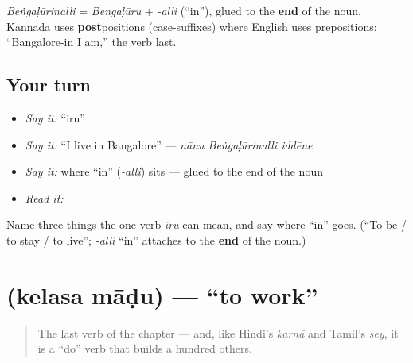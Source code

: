 \begin{grammarlens}[title={Grammar Lens: \textquotedblleft{}in\textquotedblright{} comes after the noun}]
\emph{Beṅgaḷūrinalli} = \emph{Bengaḷūru} + \emph{-alli} (\textquotedblleft{}in\textquotedblright{}), glued to the \textbf{end} of the noun. Kannada uses \textbf{post}positions (case-suffixes) where English uses prepositions: \textquotedblleft{}Bangalore-in I am,\textquotedblright{} the verb last.
\end{grammarlens}

\subsection*{Your turn}
\begin{itemize}
\raggedright
  \item \emph{Say it:} \textquotedblleft{}iru\textquotedblright{}
  \item \emph{Say it:} \textquotedblleft{}I live in Bangalore\textquotedblright{} — \emph{nānu Beṅgaḷūrinalli iddēne}
  \item \emph{Say it:} where \textquotedblleft{}in\textquotedblright{} (\emph{-alli}) sits — glued to the end of the noun
  \item \emph{Read it:} \textbf{}
\end{itemize}

\begin{tcolorbox}[breakable,colback=teal!4,colframe=teal!35!black,title={Before you move on}]
Name three things the one verb \emph{iru} can mean, and say where \textquotedblleft{}in\textquotedblright{} goes. (\textquotedblleft{}To be / to stay / to live\textquotedblright{}; \emph{-alli} \textquotedblleft{}in\textquotedblright{} attaches to the \textbf{end} of the noun.)
\end{tcolorbox}
\section[\texorpdfstring{\kn{ಕೆಲಸ} \kn{ಮಾಡು} (kelasa māḍu)}{ಕೆಲಸ ಮಾಡು (kelasa māḍu)}]{  (kelasa māḍu) — \textquotedblleft{}to work\textquotedblright{}}

\label{lesson:KA-C05-kelasa-maadu}



\begin{quote}
The last verb of the chapter — and, like Hindi's \emph{karnā} and Tamil's \emph{sey}, it is a \textquotedblleft{}do\textquotedblright{} verb that builds a hundred others.
\end{quote}

